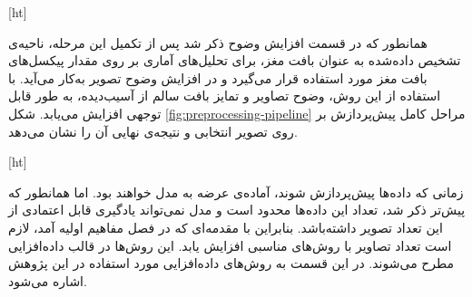 
[ht]

همانطور که در قسمت افزایش وضوح ذکر شد پس از تکمیل این مرحله، ناحیه‌ی تشخیص داده‌شده به عنوان بافت مغز، برای تحلیل‌های آماری بر روی مقدار پیکسل‌های بافت مغز مورد استفاده قرار می‌گیرد و در افزایش وضوح تصویر به‌کار می‌آید.
با استفاده از این روش، وضوح تصاویر و تمایز بافت سالم از آسیب‌دیده، به طور قابل توجهی افزایش می‌یابد.
شکل \ref{fig:preprocessing-pipeline}
مراحل کامل پیش‌پردازش بر روی تصویر انتخابی و نتیجه‌ی نهایی آن را نشان می‌دهد.


[ht]



زمانی که داده‌ها پیش‌پردازش شوند، آماده‌ی عرضه به مدل خواهند بود.
اما همانطور که پیش‌تر ذکر شد، تعداد این داده‌ها محدود است و مدل نمی‌تواند یادگیری قابل اعتمادی از این تعداد تصویر داشته‌باشد.
بنابراین
 با مقدمه‌ای که در فصل مفاهیم اولیه آمد، لازم است تعداد تصاویر با روش‌های مناسبی افزایش یابد.
 این روش‌ها در قالب داده‌افزایی مطرح می‌شوند.
 در این قسمت به روش‌های داده‌افزایی مورد استفاده در این پژوهش اشاره می‌شود.

